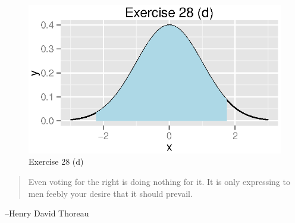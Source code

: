 \documentclass{exam}
\begin{document}
\begin{description}
        \begin{figure}[H]
          \centering
          \includegraphics{figures/ex28d.eps}
          \caption{Exercise 28 (d)}
        \end{figure}

      \item
    \end{description}

  \else
    \vspace{11 cm}
    \begin{quote}
      \begin{em}
        Even voting for the right is doing nothing for it. It is only expressing to men feebly your desire that it
        should prevail. 
      \end{em}
    \end{quote}
    \hspace{1 cm} --Henry David Thoreau
  \fi
\end{document}
